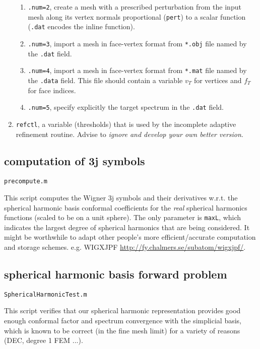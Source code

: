 \documentclass[11pt]{article}
\theoremstyle{definition}
\begin{document}
\begin{enumerate}
\begin{enumerate}
		\item \verb|.num=2|, create a mesh with a prescribed perturbation from the input mesh along its vertex normals proportional (\verb|pert|) to a scalar function (\verb|.dat| encodes the inline function).
		
		\item \verb|.num=3|, import a mesh in face-vertex format from \verb|*.obj| file named by the \verb|.dat| field.
		
		\item \verb|.num=4|, import a mesh in face-vertex format from \verb|*.mat| file named by the \verb|.data| field. This file should contain a variable $v_T$ for vertices and $f_T$ for face indices.
		
		\item \verb|.num=5|, specify explicitly the target spectrum in the \verb|.dat| field.
		
	\end{enumerate}
	
	\item \verb|refctl|, a variable (thresholds) that is used by the incomplete adaptive refinement routine. Advise to \textit{ignore and develop your own better version}.
	
\end{enumerate}

\subsection{computation of 3j symbols}
\verb|precompute.m|

This script computes the Wigner 3j symbols and their derivatives w.r.t. the spherical harmonic basis conformal coefficients for the \textit{real} spherical harmonics functions (scaled to be on a unit sphere). The only parameter is \verb|maxL|, which indicates the largest degree of spherical harmonics that are being considered. It might be worthwhile to adapt other people's more efficient/accurate computation and storage schemes. e.g. WIGXJPF \url{http://fy.chalmers.se/subatom/wigxjpf/}.

\subsection{spherical harmonic basis forward problem}
\verb|SphericalHarmonicTest.m|

This script verifies that our spherical harmonic representation provides good enough conformal factor and spectrum convergence with the simplicial basis, which is known to be correct (in the fine mesh limit) for a variety of reasons (DEC, degree 1 FEM ...).
\end{document}
